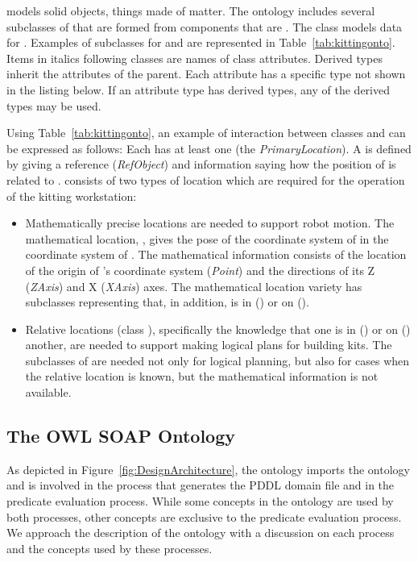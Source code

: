  models solid objects, things made of matter. The  ontology includes several subclasses of  that are formed from
components that are . The  class models data for . Examples of subclasses for  and  are represented in Table~\ref{tab:kittingonto}. Items in italics following classes are names of class attributes. Derived types inherit the attributes of the parent. Each attribute has a specific type not shown in the listing below. If an attribute type has derived types, any of the derived types may be used.

Using Table~\ref{tab:kittingonto}, an example of interaction between classes  and  can be expressed as follows: Each   has at least one  (the \textit{PrimaryLocation}). A  is defined by giving a reference   (\textit{RefObject}) and information saying how the position of  is related to .  consists of two types of location which are required for the operation of the kitting workstation:
\begin{itemize}
 \item Mathematically precise locations are needed to support robot motion. The mathematical location, , gives the pose of the coordinate system of  in the coordinate system of . The mathematical information consists of the location of the origin of 's coordinate system (\textit{Point}) and the directions of its Z (\textit{ZAxis}) and X (\textit{XAxis}) axes. The mathematical location variety has subclasses representing that, in addition,  is in  () or on  ().
\item Relative locations (class ), specifically the knowledge that one  is in () or on () another, are needed to support making logical plans for building kits. The subclasses of  are needed not only for
logical planning, but also for cases when the relative location is known, but the
mathematical information is not available.
\end{itemize}


\subsection{The OWL SOAP Ontology}\label{owlsoap}
As depicted in Figure~\ref{fig:DesignArchitecture}, the  ontology imports the  ontology and is involved in the process that generates the PDDL domain file and in the predicate evaluation process. While some concepts in the  ontology are used by both processes, other concepts are exclusive to the predicate evaluation process. We approach the description of the  ontology with a discussion on each process and the concepts used by these processes.

